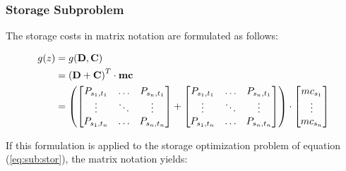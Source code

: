 \subsubsection*{Storage Subproblem}

The storage costs in matrix notation are formulated as follows:

\begin{subequations}
	\begin{align}
		g(z) &= g(\vb{D}, \vb{C})\\
		& = \left(\vb{D} + \vb{C}\right)^T \cdot \vb{mc} \\
		& = \left(\begin{bmatrix}
			P_{s_1,t_1} & \dots & P_{s_n,t_1} \\
			\vdots & \ddots & \vdots \\
			P_{s_1,t_n} & \dots & P_{s_n,t_n}
		\end{bmatrix} + \begin{bmatrix}
			P_{s_1,t_1} & \dots & P_{s_n,t_1} \\
			\vdots & \ddots & \vdots \\
			P_{s_1,t_n} & \dots & P_{s_n,t_n}
		\end{bmatrix} \right) \cdot \begin{bmatrix}
			mc_{s_1} \\
			\vdots \\
			mc_{s_n}
		\end{bmatrix}
	\end{align}
\end{subequations}

If this formulation is applied to the storage optimization problem of equation (\ref{eq:sub:stor}), the matrix notation yields:

